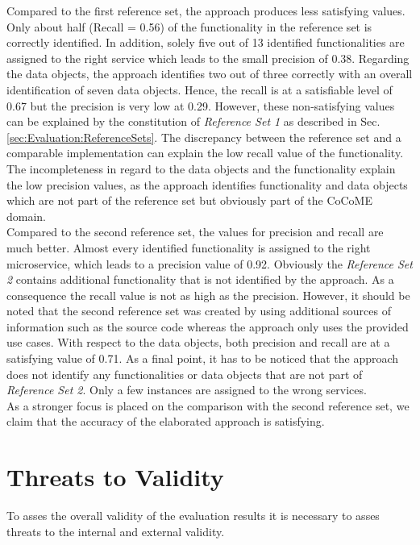 \noindent
Compared to the first reference set, the approach produces less 
satisfying values. Only about half (Recall = 0.56) of the functionality in the reference set is correctly identified.  In addition, solely five out of 13 identified functionalities are assigned to the right service which leads to the small precision of 0.38. Regarding the data objects, the approach identifies two out of three correctly with an overall identification of seven data objects. Hence, the recall is at a satisfiable level of 0.67 but the precision is very low at 0.29. However, these non-satisfying values can be explained by the constitution of \textit{Reference Set 1} as described in Sec.\ref{sec:Evaluation:ReferenceSets}. The discrepancy between the reference set and a comparable implementation can explain the low recall value of the functionality. The incompleteness in regard to the data objects and the functionality explain the low precision values, as the approach identifies functionality and data objects which are not part of the reference set but obviously part of the CoCoME domain.\\

\noindent
Compared to the second reference set, the values for precision and recall are much better. Almost every identified functionality is assigned to the right microservice, which leads to a precision value of 0.92. Obviously the \textit{Reference Set 2} contains additional functionality that is not identified by the approach. As a consequence the recall value is not as high as the precision. However, it should be noted that the second reference set was created by using additional sources of information such as the source code whereas the approach only uses the provided use cases. With respect to the data objects, both precision and recall are at a satisfying value of 0.71. As a final point, it has to be noticed that the approach does not identify any functionalities or data objects that are not part of \textit{Reference Set 2}. Only a few instances are assigned to the wrong services. \\
As a stronger focus is placed on the comparison with the second reference set, we claim that the accuracy of the elaborated approach is satisfying.
 






\section{Threats to Validity}
\label{sec:Evalutation:ThreatsToValidity}
To asses the overall validity of the evaluation results it is necessary to asses threats to the internal and external validity. 


